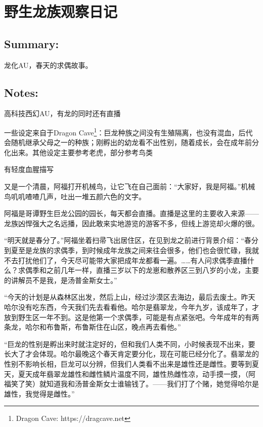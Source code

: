 \documentclass[../main.tex]{subfiles}
\begin{document}
\pagestyle{mystyle}

\chapter{野生龙族观察日记}

\vspace{3cm}

\section*{Summary:}

龙化AU，春天的求偶故事。

\section*{Notes:}
高科技西幻AU，有龙的同时还有直播

一些设定来自于Dragon Cave\footnote[1]{Dragon Cave: https://dragcave.net}：巨龙种族之间没有生殖隔离，也没有混血，后代会随机继承父母之一的种族；刚孵出的幼龙看不出性别，随着成长，会在成年前分化出来。其他设定主要参考老虎，部分参考鸟类

有轻度血腥描写

\newpage

又是一个清晨，阿福打开机械鸟，让它飞在自己面前：“大家好，我是阿福。”机械鸟叽叽喳喳几声，吐出一堆五颜六色的文字。

阿福是哥谭野生巨龙公园的园长，每天都会直播。直播是这里的主要收入来源——龙族凶悍强大之名远播，因此敢来实地游览的游客不多，但线上游览却火爆的很。

“明天就是春分了。”阿福坐着扫帚飞出居住区，在见到龙之前进行背景介绍：“春分到夏至是龙族的求偶季，到时候成年龙族之间来往会很多，他们也会很忙碌，我就不去打扰他们了，今天尽可能带大家把成年龙都看一遍。……有人问求偶季直播什么？求偶季和之前几年一样，直播三岁以下的龙崽和散养区三到八岁的小龙，主要的讲解员不是我，是汤普金斯女士。”

“今天的计划是从森林区出发，然后上山，经过沙漠区去海边，最后去废土。昨天哈尔没有吃东西，今天我们先去看看他。哈尔是翡翠龙，今年九岁，该成年了，才放到野生区一年不到。这是他第一个求偶季，可能是有点紧张吧。今年成年的有两条龙，哈尔和布鲁斯，布鲁斯住在山区，晚点再去看他。”

“巨龙的性别是孵出来时就注定好的，但和我们人类不同，小时候表现不出来，要长大了才会体现。哈尔最晚这个春天肯定要分化，现在可能已经分化了。翡翠龙的性别不影响长相，巨龙可以分辨，但我们人类看不出来是雄性还是雌性。要等到夏天，夏天成年翡翠龙雄性和雌性鳞片温度不同，雄性热雌性凉，动手摸一摸，（阿福笑了笑）就知道我和汤普金斯女士谁输钱了。——我们打了个赌，她觉得哈尔是雄性，我觉得是雌性。”
\end{document}
